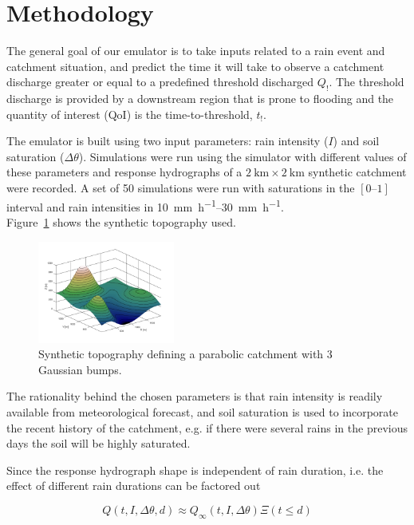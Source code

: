 \documentclass[12pt,a4paper,english,twocolumn,fleqn]{narms}
\begin{document}
\section{Methodology}

The general goal of our emulator is to take inputs related to a rain event and catchment situation, and predict the time it will take to observe a catchment discharge greater or equal to a predefined threshold discharged $Q_!$.
The threshold discharge is provided by a downstream region that is prone to flooding and the quantity of interest (QoI) is the time-to-threshold, $t_!$.

The emulator is built using two input parameters: rain intensity ($I$) and soil saturation ($\Delta\theta$).
Simulations were run using the simulator with different values of these parameters and response hydrographs of a $\SI{2}{\kilo\metre} \times \SI{2}{\kilo\metre}$ synthetic catchment were recorded.
A set of \num{50} simulations were run with saturations in the $[\numrange{0}{1}]$ interval
and rain intensities in \SIrange{10}{30}{\milli\metre\per\hour}.\\
Figure~\ref{img:topography} shows the synthetic topography used.

\begin{figure}[htpb]
  \centering
  \includegraphics[width=0.4\textwidth]{img/topography.png}
  \caption{Synthetic topography defining a parabolic catchment with \num{3} Gaussian bumps.}
  \label{img:topography}
\end{figure}

The rationality behind the chosen parameters is that rain intensity is readily available from meteorological forecast, and soil saturation is used to incorporate the recent history of the catchment, e.g. if there were several rains in the previous days the soil will be highly saturated.

Since the response hydrograph shape is independent of rain duration, i.e. the effect of different rain durations can be factored out

\begin{equation}
Q(t, I, \Delta\theta, d) \approx Q_\infty(t, I, \Delta\theta) \Xi(t \leq d)
\end{equation}
\end{document}
